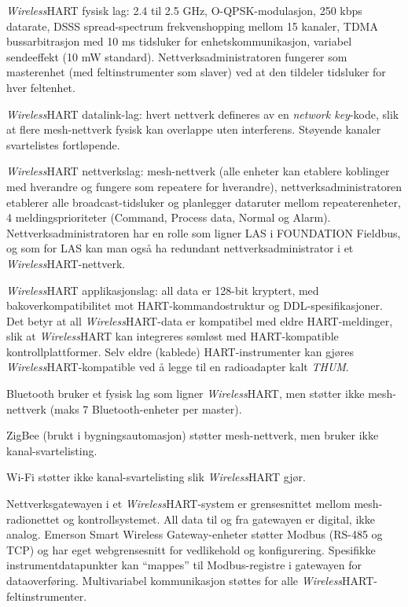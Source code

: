 {\sl Wireless}HART fysisk lag: 2.4 til 2.5 GHz, O-QPSK-modulasjon, 250 kbps datarate, DSSS spread-spectrum frekvenshopping mellom 15 kanaler, TDMA bussarbitrasjon med 10 ms tidsluker for enhetskommunikasjon, variabel sendeeffekt (10 mW standard). Nettverksadministratoren fungerer som masterenhet (med feltinstrumenter som slaver) ved at den tildeler tidsluker for hver feltenhet.

\vskip 10pt

{\sl Wireless}HART datalink-lag: hvert nettverk defineres av en \textit{network key}-kode, slik at flere mesh-nettverk fysisk kan overlappe uten interferens. Støyende kanaler svartelistes fortløpende.

\vskip 10pt

{\sl Wireless}HART nettverkslag: mesh-nettverk (alle enheter kan etablere koblinger med hverandre og fungere som repeatere for hverandre), nettverksadministratoren etablerer alle broadcast-tidsluker og planlegger dataruter mellom repeaterenheter, 4 meldingsprioriteter (Command, Process data, Normal og Alarm). Nettverksadministratoren har en rolle som ligner LAS i FOUNDATION Fieldbus, og som for LAS kan man også ha redundant nettverksadministrator i et {\sl Wireless}HART-nettverk.

\vskip 10pt

{\sl Wireless}HART applikasjonslag: all data er 128-bit kryptert, med bakoverkompatibilitet mot HART-kommandostruktur og DDL-spesifikasjoner. Det betyr at all {\sl Wireless}HART-data er kompatibel med eldre HART-meldinger, slik at {\sl Wireless}HART kan integreres sømløst med HART-kompatible kontrollplattformer. Selv eldre (kablede) HART-instrumenter kan gjøres {\sl Wireless}HART-kompatible ved å legge til en radioadapter kalt \textit{THUM}.

\vskip 10pt

Bluetooth bruker et fysisk lag som ligner {\sl Wireless}HART, men støtter ikke mesh-nettverk (maks 7 Bluetooth-enheter per master).

\vskip 10pt

ZigBee (brukt i bygningsautomasjon) støtter mesh-nettverk, men bruker ikke kanal-svartelisting.

\vskip 10pt

Wi-Fi støtter ikke kanal-svartelisting slik {\sl Wireless}HART gjør.

\vskip 30pt

Nettverksgatewayen i et {\sl Wireless}HART-system er grensesnittet mellom mesh-radionettet og kontrollsystemet. All data til og fra gatewayen er digital, ikke analog. Emerson Smart Wireless Gateway-enheter støtter Modbus (RS-485 og TCP) og har eget webgrensesnitt for vedlikehold og konfigurering. Spesifikke instrumentdatapunkter kan ``mappes'' til Modbus-registre i gatewayen for dataoverføring. Multivariabel kommunikasjon støttes for alle {\sl Wireless}HART-feltinstrumenter.


